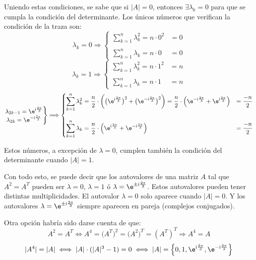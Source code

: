 \documentclass[../../main.tex]{subfiles}
\begin{document}
  Uniendo estas condiciones, se sabe que si $|A| = 0$, entonces $\exists \lambda_k = 0$ para que se cumpla la condición del determinante. Los únicos números que verifican la condición de la traza son:
  $$
  \lambda_k = 0 
  \Longrightarrow
  \begin{cases} 
    \displaystyle\sum_{k = 1}^n \lambda_k^2 = n \cdot 0^2 & = 0 \\ \\
    \displaystyle\sum_{k = 1}^n \lambda_k = n \cdot 0 & = 0 
  \end{cases}
  $$
  $$
  \lambda_k = 1 
  \Longrightarrow
  \begin{cases} 
    \displaystyle\sum_{k = 1}^n \lambda_k^2 = n \cdot 1^2 & = n \\ \\
    \displaystyle\sum_{k = 1}^n \lambda_k = n \cdot 1 & = n 
  \end{cases}
  $$
  $$
  \left . 
    \begin{matrix} 
      \lambda_{2k - 1} = \e^{\text{i} \frac{2\pi}{3}} \\
      \lambda_{2k} = \e^{-\text{i} \frac{2\pi}{3}}
    \end{matrix}
  \right \}
  \Longrightarrow
  \begin{cases} 
    \displaystyle\sum_{k = 1}^n \lambda_k^2 = 
    \frac{n}{2} \cdot \bigg(\big(\e^{\text{i} \frac{2\pi}{3}}\big)^2 + \big(\e^{-\text{i} \frac{2\pi}{3}}\big)^2 \bigg) = 
    \frac{n}{2} \cdot \Big(\e^{-\text{i} \frac{2\pi}{3}} + \e^{\text{i} \frac{2\pi}{3}}\Big) & = 
    \displaystyle\frac{-n}{2} \\ \\
    \displaystyle\sum_{k = 1}^n \lambda_k = 
    \frac{n}{2} \cdot \Big(\e^{\text{i} \frac{2\pi}{3}} + \e^{-\text{i} \frac{2\pi}{3}}\Big) & = 
    \displaystyle\frac{-n}{2}
  \end{cases}
  $$

  Estos números, a excepción de $\lambda = 0$, cumplen también la condición del determinante cuando $|A| = 1$.

  Con todo esto, se puede decir que los autovalores de una matriz $A$ tal que $A^2 = A^T$ pueden ser $\lambda = 0$, $\lambda = 1$ ó $\lambda = \e^{\pm \text{i} \frac{2\pi}{3}}$. Estos autovalores pueden tener distintas multiplicidades. El autovalor $\lambda = 0$ solo aparece cuando $|A| = 0$. Y los autovalores $\lambda = \e^{\pm \text{i} \frac{2\pi}{3}}$ siempre aparecen en pareja (complejos conjugados).

  Otra opción habría sido darse cuenta de que:
  $$
  A^2 = A^T \iff A^4 = \big(A^T\big)^2 = \big(A^2\big)^T = (A^T)^T \Longrightarrow A^4 = A
  $$
  $$
  |A^4| = |A| \iff |A| \cdot (|A|^3 - 1) = 0 \iff |A| = \left\{0, 1, \e^{\text{i} \frac{2\pi}{3}}, \e^{-\text{i} \frac{2\pi}{3}}\right\}
  $$
\end{document}
